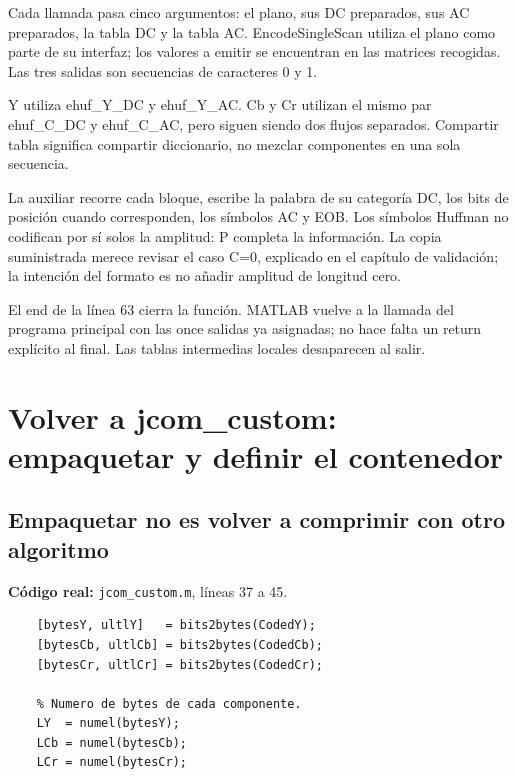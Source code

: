 \documentclass[11pt,a4paper,oneside]{report}
\begin{document}
Cada llamada pasa cinco argumentos: el plano, sus DC preparados, sus AC
preparados, la tabla DC y la tabla AC. EncodeSingleScan utiliza el plano
como parte de su interfaz; los valores a emitir se encuentran en las matrices
recogidas. Las tres salidas son secuencias de caracteres 0 y 1.

Y utiliza ehuf\_Y\_DC y ehuf\_Y\_AC. Cb y Cr utilizan el mismo par ehuf\_C\_DC
y ehuf\_C\_AC, pero siguen siendo dos flujos separados. Compartir tabla
significa compartir diccionario, no mezclar componentes en una sola secuencia.

La auxiliar recorre cada bloque, escribe la palabra de su categoría DC,
los bits de posición cuando corresponden, los símbolos AC y EOB. Los símbolos
Huffman no codifican por sí solos la amplitud: P completa la información.
La copia suministrada merece revisar el caso C=0, explicado en el capítulo
de validación; la intención del formato es no añadir amplitud de longitud cero.

El end de la línea 63 cierra la función. MATLAB vuelve a la llamada del
programa principal con las once salidas ya asignadas; no hace falta un return
explícito al final. Las tablas intermedias locales desaparecen al salir.


\section{Volver a jcom\_custom: empaquetar y definir el contenedor}

\par\medskip\noindent\begin{minipage}{\linewidth}

\subsection{Empaquetar no es volver a comprimir con otro algoritmo}

\textbf{Código real:} \texttt{jcom\_custom.m}, líneas 37 a 45.

\begin{lstlisting}[firstnumber=37]
    % PASO 7: empaquetar las secuencias binarias en bytes.
    [bytesY, ultlY]   = bits2bytes(CodedY);
    [bytesCb, ultlCb] = bits2bytes(CodedCb);
    [bytesCr, ultlCr] = bits2bytes(CodedCr);

    % Numero de bytes de cada componente.
    LY  = numel(bytesY);
    LCb = numel(bytesCb);
    LCr = numel(bytesCr);
\end{lstlisting}

\end{minipage}\par
\end{document}

